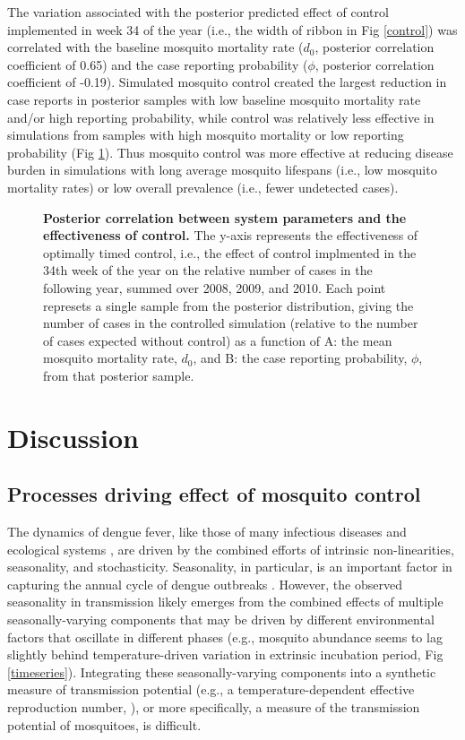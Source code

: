 \documentclass[10pt,letterpaper]{article}
\begin{document}
The variation associated with the posterior predicted effect of control implemented in week 34 of the year (i.e., the width of ribbon in Fig \ref{control}) was correlated with the baseline mosquito mortality rate ($d_0$, posterior correlation coefficient of 0.65) and the case reporting probability ($\phi$, posterior correlation coefficient of -0.19).
Simulated mosquito control created the largest reduction in case reports in posterior samples with low baseline mosquito mortality rate and/or high reporting probability, while control was relatively less effective in simulations from samples with high mosquito mortality or low reporting probability (Fig \ref{correlations}).
Thus mosquito control was more effective at reducing disease burden in simulations with long average mosquito lifespans (i.e., low mosquito mortality rates) or low overall prevalence (i.e., fewer undetected cases). 


\begin{figure}[!h]
\caption{{\bf Posterior correlation between system parameters and the effectiveness of control.}
The y-axis represents the effectiveness of optimally timed control, i.e., the effect of control implmented in the 34th week of the year on the relative number of cases in the following year, summed over 2008, 2009, and 2010.
Each point represets a single sample from the posterior distribution, giving the number of cases in the controlled simulation (relative to the number of cases expected without control) as a function of A: the mean mosquito mortality rate, $d_0$, and B: the case reporting probability, $\phi$, from that posterior sample.
}
\label{correlations}
\end{figure}

\section*{Discussion}

\subsection*{Processes driving effect of mosquito control}

The dynamics of dengue fever, like those of many infectious diseases \cite{Ellner1998,Koelle2004} and ecological systems \cite{Bjornstad2001}, are driven by the combined efforts of intrinsic non-linearities, seasonality, and stochasticity.
Seasonality, in particular, is an important factor in capturing the annual cycle of dengue outbreaks \cite{Wearing2006,Aguiar2011,Reich2013}.
However, the observed seasonality in transmission likely emerges from the combined effects of multiple seasonally-varying components that may be driven by different environmental factors that oscillate in different phases (e.g., mosquito abundance seems to lag slightly behind temperature-driven variation in extrinsic incubation period, Fig \ref{timeseries}).
Integrating these seasonally-varying components into a synthetic measure of transmission potential (e.g., a temperature-dependent effective reproduction number, \cite{Codeco2018}), or more specifically, a measure of the transmission potential of mosquitoes, is difficult.
\end{document}
